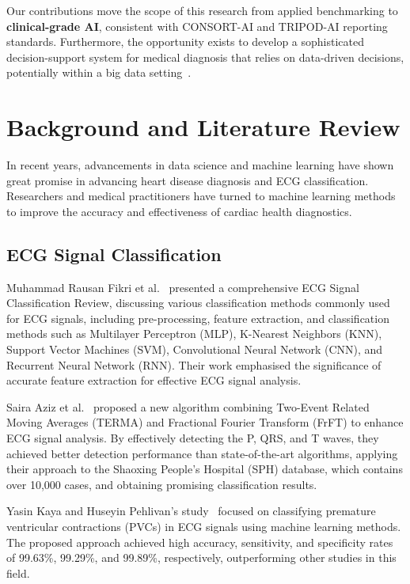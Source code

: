\documentclass[10pt, twocolumn]{article}
\begin{document}
Our contributions move the scope of this research from applied benchmarking to
\textbf{clinical-grade AI}, consistent with CONSORT-AI and TRIPOD-AI reporting standards.
Furthermore, the opportunity exists to develop a sophisticated decision-support system for
medical diagnosis that relies on data-driven decisions, potentially within a big data
setting~\cite{tourad2018,outfarouin2016}.

\section{Background and Literature Review}

In recent years, advancements in data science and machine learning have shown great promise
in advancing heart disease diagnosis and ECG classification.
Researchers and medical practitioners have turned to machine learning methods to improve the
accuracy and effectiveness of cardiac health diagnostics.

\subsection{ECG Signal Classification}

Muhammad Rausan Fikri et al.~\cite{muhammad2021} presented a comprehensive ECG Signal
Classification Review, discussing various classification methods commonly used for ECG signals,
including pre-processing, feature extraction, and classification methods such as
Multilayer Perceptron (MLP), K-Nearest Neighbors (KNN), Support Vector Machines (SVM),
Convolutional Neural Network (CNN), and Recurrent Neural Network (RNN).
Their work emphasised the significance of accurate feature extraction for effective ECG signal
analysis.

Saira Aziz et al.~\cite{aziz2021} proposed a new algorithm combining Two-Event Related
Moving Averages (TERMA) and Fractional Fourier Transform (FrFT) to enhance ECG signal
analysis.
By effectively detecting the P, QRS, and T waves, they achieved better detection performance
than state-of-the-art algorithms, applying their approach to the Shaoxing People's Hospital
(SPH) database, which contains over 10,000 cases, and obtaining promising classification
results.

Yasin Kaya and Huseyin Pehlivan's study~\cite{kaya2015} focused on classifying premature
ventricular contractions (PVCs) in ECG signals using machine learning methods.
The proposed approach achieved high accuracy, sensitivity, and specificity rates of 99.63\%,
99.29\%, and 99.89\%, respectively, outperforming other studies in this field.
\end{document}
